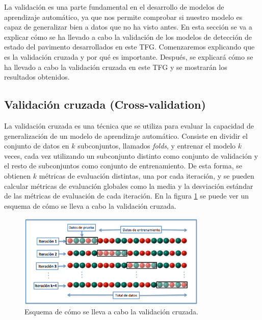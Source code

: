 
La validación es una parte fundamental en el desarrollo de modelos de aprendizaje automático, ya que nos permite comprobar si nuestro modelo es capaz de generalizar bien a datos que no ha visto antes. En esta sección se va a explicar cómo se ha llevado a cabo la validación de los modelos de detección de estado del pavimento desarrollados en este TFG. Comenzaremos explicando que es la validación cruzada y por qué es importante. Después, se explicará cómo se ha llevado a cabo la validación cruzada en este TFG y se mostrarán los resultados obtenidos.

\subsection{Validación cruzada (Cross-validation)}
La validación cruzada es una técnica que se utiliza para evaluar la capacidad de generalización de un modelo de aprendizaje automático. Consiste en dividir el conjunto de datos en $k$ subconjuntos, llamados \textit{folds}, y entrenar el modelo $k$ veces, cada vez utilizando un subconjunto distinto como conjunto de validación y el resto de subconjuntos como conjunto de entrenamiento. De esta forma, se obtienen $k$ métricas de evaluación distintas, una por cada iteración, y se pueden calcular métricas de evaluación globales como la media y la desviación estándar de las métricas de evaluación de cada iteración. En la figura \ref{fig:cross_validation} se puede ver un esquema de cómo se lleva a cabo la validación cruzada.

\begin{figure}[H]
    \centering
    \includegraphics[width=0.8\textwidth]{img/K-fold_cross_validation.jpg}
    \caption{Esquema de cómo se lleva a cabo la validación cruzada. \cite{KFoldCV_image}}
    \label{fig:cross_validation}
\end{figure}

